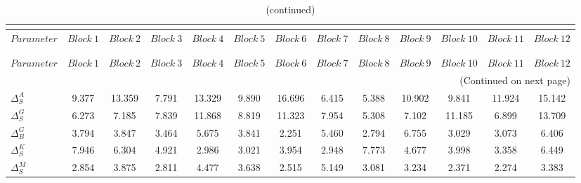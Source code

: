  
\begin{center}
\begin{longtable}{lcccccccccccc} 
\caption{MCMC Inefficiency factors per block}\\
 \label{Table:MCMC_inefficiency_factors}\\
\toprule 
$Parameter             $	 & 	 $     Block~1$	 & 	 $     Block~2$	 & 	 $     Block~3$	 & 	 $     Block~4$	 & 	 $     Block~5$	 & 	 $     Block~6$	 & 	 $     Block~7$	 & 	 $     Block~8$	 & 	 $     Block~9$	 & 	 $    Block~10$	 & 	 $    Block~11$	 & 	 $    Block~12$\\
\midrule \endfirsthead 
\caption{(continued)}\\
 \toprule \\ 
$Parameter             $	 & 	 $     Block~1$	 & 	 $     Block~2$	 & 	 $     Block~3$	 & 	 $     Block~4$	 & 	 $     Block~5$	 & 	 $     Block~6$	 & 	 $     Block~7$	 & 	 $     Block~8$	 & 	 $     Block~9$	 & 	 $    Block~10$	 & 	 $    Block~11$	 & 	 $    Block~12$\\
\midrule \endhead 
\midrule \multicolumn{13}{r}{(Continued on next page)} \\ \bottomrule \endfoot 
\bottomrule \endlastfoot 
$ {\Delta^{A}_{S}}     $	 & 	       9.377	 & 	      13.359	 & 	       7.791	 & 	      13.329	 & 	       9.890	 & 	      16.696	 & 	       6.415	 & 	       5.388	 & 	      10.902	 & 	       9.841	 & 	      11.924	 & 	      15.142 \\ 
$ {\Delta^{G}_{S}}     $	 & 	       6.273	 & 	       7.185	 & 	       7.839	 & 	      11.868	 & 	       8.819	 & 	      11.323	 & 	       7.954	 & 	       5.308	 & 	       7.102	 & 	      11.185	 & 	       6.899	 & 	      13.709 \\ 
$ {\Delta^{G}_{B}}     $	 & 	       3.794	 & 	       3.847	 & 	       3.464	 & 	       5.675	 & 	       3.841	 & 	       2.251	 & 	       5.460	 & 	       2.794	 & 	       6.755	 & 	       3.029	 & 	       3.073	 & 	       6.406 \\ 
$ {\Delta^{K}_{S}}     $	 & 	       7.946	 & 	       6.304	 & 	       4.921	 & 	       2.986	 & 	       3.021	 & 	       3.954	 & 	       2.948	 & 	       7.773	 & 	       4.677	 & 	       3.998	 & 	       3.358	 & 	       6.449 \\ 
$ {\Delta^{M}_{S}}     $	 & 	       2.854	 & 	       3.875	 & 	       2.811	 & 	       4.477	 & 	       3.638	 & 	       2.515	 & 	       5.149	 & 	       3.081	 & 	       3.234	 & 	       2.371	 & 	       2.274	 & 	       3.383 \\ 

\end{longtable}
\end{center}

